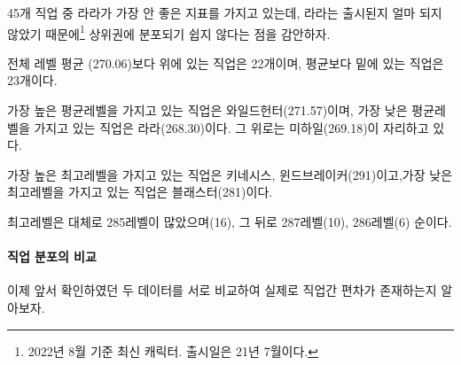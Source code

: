 \documentclass[
]{article}
\begin{document}
45개 직업 중 라라가 가장 안 좋은 지표를 가지고 있는데, 라라는 출시된지
얼마 되지 않았기 때문에\footnote{2022년 8월 기준 최신 캐릭터. 출시일은
  21년 7월이다.} 상위권에 분포되기 쉽지 않다는 점을 감안하자.

전체 레벨 평균 (270.06)보다 위에 있는 직업은 22개이며, 평균보다 밑에
있는 직업은 23개이다.

가장 높은 평균레벨을 가지고 있는 직업은 와일드헌터(271.57)이며, 가장
낮은 평균레벨을 가지고 있는 직업은 라라(268.30)이다. 그 위로는
미하일(269.18)이 자리하고 있다.

가장 높은 최고레벨을 가지고 있는 직업은 키네시스,
윈드브레이커(291)이고,가장 낮은 최고레벨을 가지고 있는 직업은
블래스터(281)이다.

최고레벨은 대체로 285레벨이 많았으며(16), 그 뒤로 287레벨(10),
286레벨(6) 순이다.

\hypertarget{uxc9c1uxc5c5-uxbd84uxd3ecuxc758-uxbe44uxad50}{%
\paragraph{직업 분포의
비교}\label{uxc9c1uxc5c5-uxbd84uxd3ecuxc758-uxbe44uxad50}}

이제 앞서 확인하였던 두 데이터를 서로 비교하여 실제로 직업간 편차가
존재하는지 알아보자.
\end{document}
